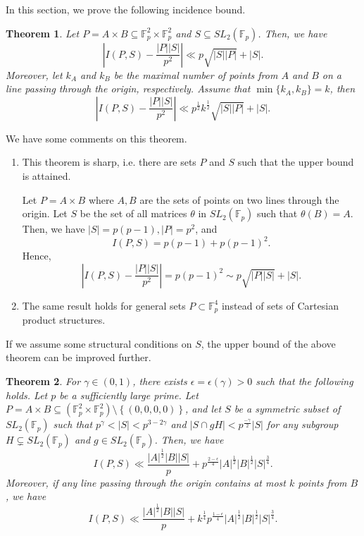 \documentclass[11pt]{article}
\newtheorem{theorem}{Theorem}[section]
\def\Fbb{\mathbb{F}}
\def\SL{SL}
\def\l({\left(}
\def\r){\right)}
\def\lv{\left\vert}
\def\rv{\right\vert}
\def\lo{\left\{}
\def\ro{\right\}}
\begin{document}
In this section, we prove the following incidence bound. 

\begin{theorem}\label{incidence} Let $P=A\times B \subseteq \mathbb{F}_p^2\times \mathbb{F}_p^2$ and $S \subseteq \SL_2 \l( \Fbb_p \r) $. Then, we have
    \[\lv I(P,S)- \frac{\lv P\rv \lv S\rv}{p^2} \rv \ll p\sqrt{\lv S\rv \lv P\rv}+|S|.\]
Moreover, let $k_A$ and  $k_B$ be the maximal number of points from $A$ and $B$ on a line passing through the origin, respectively. Assume that $\min\{k_A, k_B\}= k$,
then
 \[\lv I(P,S)- \frac{\lv P\rv \lv S\rv}{p^2} \rv \ll p^{\frac{1}{2}}k^{\frac{1}{2}}\sqrt{\lv S\rv \lv P\rv}+|S|.\]
\end{theorem}

We have some comments on this theorem. 
\begin{enumerate}
    \item This theorem is sharp, i.e. there are sets $P$ and $S$ such that the upper bound is attained. 

     Let $P= A \times B$ where $A,B$ are the sets of points on two lines through the origin. Let $S$ be the set of all matrices $\theta$ in $\SL_2 \l( \Fbb_p \r)$ such that $\theta (B)=A$. Then, we have $\lv S\rv =p(p-1), \lv P\rv =p^2$, and
    \[ I(P,S) = p(p-1) + p(p-1)^2.  \]
    Hence,
    \[ \lv I(P,S) - \frac{\lv P\rv \lv S\rv}{p^2} \rv = p(p-1)^2 \sim p\sqrt{\lv P\rv \lv S\rv} + \lv S\rv .\]
    
    \item The same result holds for general sets $P\subset \mathbb{F}_p^4$ instead of sets of Cartesian product structures.
\end{enumerate}
If we assume some structural conditions on $S$, the upper bound of the above theorem can be improved further. 

\begin{theorem}\label{thm: 4.12}
For $\gamma\in (0, 1)$, there exists $\epsilon=\epsilon(\gamma)>0$ such that the following holds.
    Let $p$ be a sufficiently large prime. Let $P=A\times B \subseteq (\Fbb_p^2 \times \Fbb_p^2 ) \setminus \lo (0, 0, 0, 0)\ro$, and let $S$ be a symmetric subset of $\SL_2 (\Fbb_p )$ such that $p^\gamma < |S| < p^{3-2\gamma } $ and $ |S \cap gH| < p^{\frac{-\gamma}{2}}|S|$ for any subgroup $H \subsetneq \SL_2 (\Fbb_p) $ and $g\in \SL_2(\Fbb_p)$. Then, we have 
    \[ I(P,S) \ll \frac{|A|^{\frac{1}{2}}|B||S|}{p} + p^{\frac{2-\epsilon}{4}}|A|^{\frac{1}{2}}|B|^{\frac{1}{2}}|S|^{\frac{3}{4}}.\] Moreover,  if any line passing through the origin contains at most $k$ points from $B$, we have
    \[ I(P,S) \ll \frac{|A|^{\frac{1}{2}}|B||S|}{p} + k^{\frac{1}{4}}p^{\frac{1-\epsilon}{4}}|A|^{\frac{1}{2}}|B|^{\frac{1}{2}}|S|^{\frac{3}{4}}.\]
\end{theorem}
\end{document}

